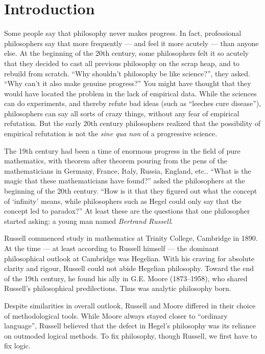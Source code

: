 \chapter{Introduction}


Some people say that philosophy never makes progress.  In fact,
professional philosophers say that more frequently --- and feel it
more acutely --- than anyone else.  At the beginning of the 20th
century, some philosophers felt it so acutely that they decided to
cast all previous philosophy on the scrap heap, and to rebuild from
scratch.  ``Why shouldn't philosophy be like science?'', they asked.
``Why can't it also make genuine progress?''  You might have thought
that they would have located the problem in the lack of empirical
data.  While the sciences can do experiments, and thereby refute bad
ideas (such as ``leeches cure disease''), philosophers can say all
sorts of crazy things, without any fear of empirical refutation.  But
the early 20th century philosophers realized that the possibility of
empirical refutation is not the {\it sine qua non} of a progressive
science.

The 19th century had been a time of enormous progress in the field of
pure mathematics, with theorem after theorem pouring from the pens of
the mathematicians in Germany, France, Italy, Russia, England, etc..
``What is the magic that these mathematicians have found?'' asked the
philosophers at the beginning of the 20th century.  ``How is it that
they figured out what the concept of `infinity' means, while
philosophers such as Hegel could only say that the concept led to
paradox?''  At least these are the questions that one philosopher
started asking: a young man named \emph{Bertrand Russell}.

Russell commenced study in mathematics at Trinity College, Cambridge
in 1890.  At the time --- at least according to Russell himself ---
the dominant philosophical outlook at Cambridge was Hegelian.  With
his craving for absolute clarity and rigour, Russell could not abide
Hegelian philosophy.  Toward the end of the 19th century, he found his
ally in G.E. Moore (1873--1958), who shared Russell's philosophical
predilections.  Thus was analytic philosophy born.

Despite similarities in overall outlook, Russell and Moore differed in
their choice of methodological tools.  While Moore always stayed
closer to ``ordinary language'', Russell believed that the defect in
Hegel's philosophy was its reliance on outmoded logical methods.  To
fix philosophy, though Russell, we first have to fix logic.

